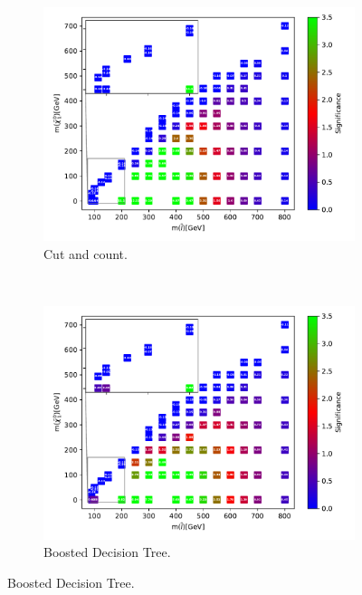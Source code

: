 \begin{figure}[H]
    \centering
    \begin{subfigure}[t!]{0.49\textwidth}
    \includegraphics[width = \textwidth]{Figures/Significances/significanceCutandCount_slepslep_all.pdf}
    \caption{Cut and count.}
        \label{fig:signHighSlepSlepcandc}
    \end{subfigure}
    \\
    \begin{subfigure}[t!]{0.49\textwidth}
    \includegraphics[width = \textwidth]{Figures/Significances/significance_BDT_slepslep_High_level.pdf}
    \caption{Boosted Decision Tree.}
        \label{fig:signHighSlepSlepBDT}
    \end{subfigure}      

\end{figure}
